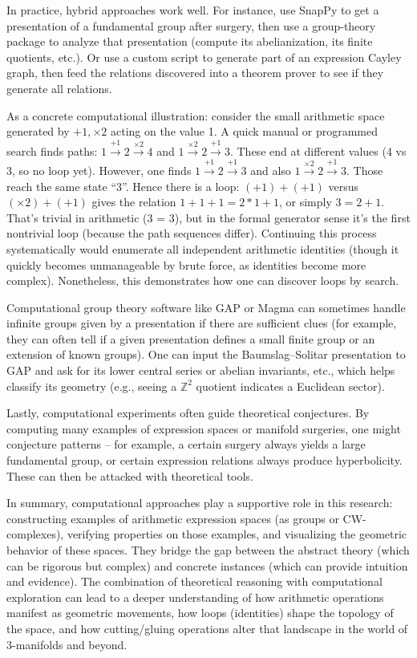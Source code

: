 \documentclass[11pt]{article}
\theoremstyle{remark}
\begin{document}
In practice, hybrid approaches work well. For instance, use SnapPy to get a presentation of a fundamental group after surgery, then use a group-theory package to analyze that presentation (compute its abelianization, its finite quotients, etc.). Or use a custom script to generate part of an expression Cayley graph, then feed the relations discovered into a theorem prover to see if they generate all relations.

As a concrete computational illustration: consider the small arithmetic space generated by ${+1, \times 2}$ acting on the value 1. A quick manual or programmed search finds paths: $1 \xrightarrow{+1} 2 \xrightarrow{\times2} 4$ and $1 \xrightarrow{\times2} 2 \xrightarrow{+1} 3$. These end at different values (4 vs 3, so no loop yet). However, one finds $1 \xrightarrow{+1} 2 \xrightarrow{+1} 3$ and also $1 \xrightarrow{\times2} 2 \xrightarrow{+1} 3$. Those reach the same state “3”. Hence there is a loop: $(+1)+(+1)$ versus $(\times2)+(+1)$ gives the relation $1+1+1 = 2*1+1$, or simply $3 = 2+1$. That’s trivial in arithmetic (3 = 3), but in the formal generator sense it’s the first nontrivial loop (because the path sequences differ). Continuing this process systematically would enumerate all independent arithmetic identities (though it quickly becomes unmanageable by brute force, as identities become more complex). Nonetheless, this demonstrates how one can discover loops by search.

Computational group theory software like GAP or Magma can sometimes handle infinite groups given by a presentation if there are sufficient clues (for example, they can often tell if a given presentation defines a small finite group or an extension of known groups). One can input the Baumslag–Solitar presentation to GAP and ask for its lower central series or abelian invariants, etc., which helps classify its geometry (e.g., seeing a $\mathbb{Z}^2$ quotient indicates a Euclidean sector).

Lastly, computational experiments often guide theoretical conjectures. By computing many examples of expression spaces or manifold surgeries, one might conjecture patterns – for example, a certain surgery always yields a large fundamental group, or certain expression relations always produce hyperbolicity. These can then be attacked with theoretical tools.

In summary, computational approaches play a supportive role in this research: constructing examples of arithmetic expression spaces (as groups or CW-complexes), verifying properties on those examples, and visualizing the geometric behavior of these spaces. They bridge the gap between the abstract theory (which can be rigorous but complex) and concrete instances (which can provide intuition and evidence). The combination of theoretical reasoning with computational exploration can lead to a deeper understanding of how arithmetic operations manifest as geometric movements, how loops (identities) shape the topology of the space, and how cutting/gluing operations alter that landscape in the world of 3-manifolds and beyond.
\end{document}
